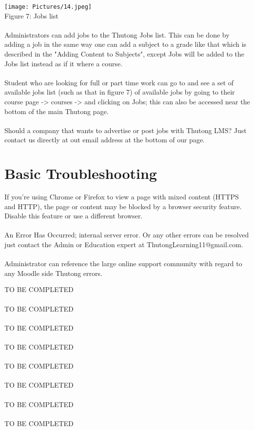 \documentclass[english]{article}
\begin{document}
\texttt{[image: Pictures/14.jpeg]} \\
Figure 7: Jobs list \\\\
Administrators can add jobs to the Thutong Jobs list. This can be done by adding a job in the same way one can add a subject to a grade like that which is described in the "Adding Content to Subjects", except Jobs will be added to the Jobs list instead as if it where a course.\\\\
Student who are looking for full or part time work can go to and see a set of available jobs list (such as that in figure 7) of available jobs by going to their course page -> courses -> and clicking on Jobs; this can also be accessed near the bottom of the main Thutong page.  \\\\ Should a  company that wants to advertise or post jobs with Thutong LMS? Just contact us directly at out email address at the bottom of our page.

		
	
\section{Basic Troubleshooting}
If you're using Chrome or Firefox to view a page with mixed content (HTTPS and HTTP), the page or content may be blocked by a browser security feature. \\ Disable this feature or use a different browser.\\\\
An Error Has Occurred; internal server error. Or any other errors can be resolved just contact the Admin or Education expert at ThutongLearning11@gmail.com. \\\\
Administrator can reference the large online support community with regard to any Moodle side Thutong errors.

TO BE COMPLETED\\\\TO BE COMPLETED\\\\TO BE COMPLETED\\\\TO BE COMPLETED\\\\TO BE COMPLETED\\\\TO BE COMPLETED\\\\TO BE COMPLETED\\\\TO BE COMPLETED\\\\
\end{document}
